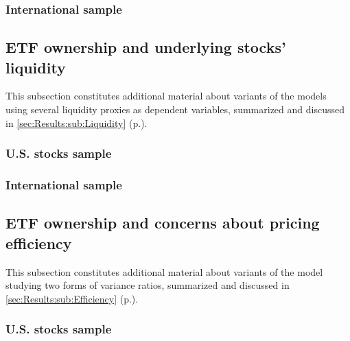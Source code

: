 \subsubsection{International sample}

\subsection{ETF ownership and underlying stocks' liquidity}
\label{app:sec:DetailedResults:Liquidity}
This subsection constitutes additional material about variants of the models using several liquidity proxies as dependent variables, summarized and discussed in \autoref{sec:Results:sub:Liquidity} (p.\pageref{sec:Results:sub:Liquidity}).
\subsubsection{U.S. stocks sample}
\begin{landscape}
  {\linespread{1.0}
    \begin{table}
      
    \end{table}
    \begin{table}
      
    \end{table}
    \begin{table}
      
    \end{table}
    \begin{table}
      
    \end{table}
  }
\end{landscape}
\subsubsection{International sample}


\subsection{ETF ownership and concerns about pricing efficiency}
\label{app:sec:DetailedResults:Efficiency}
This subsection constitutes additional material about variants of the model studying two forms of variance ratios, summarized and discussed in \autoref{sec:Results:sub:Efficiency} (p.\pageref{sec:Results:sub:Efficiency}).
\subsubsection{U.S. stocks sample}

